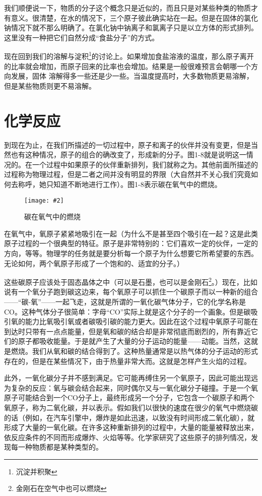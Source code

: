 \documentclass[12pt,oneside]{book}
\newenvironment{fig}[2][1]
{\begin{figure}[H]
\centering
\texttt{[image: \#2]}}
{\end{figure}}
\begin{document}
我们顺便说一下，物质的分子这个概念只是近似的，而且只是对某些种类的物质才有意义。很清楚，在水的情况下，三个原子彼此确实站在一起。但是在固体的氯化钠情况下就不那么明确了。在氯化钠中钠离子和氯离子只是以立方体的形式排列。这里没有一种把它们自然分成“食盐分子”的方式。

现在回到我们的溶解与淀积\footnote{沉淀并积聚}的讨论上。如果增加食盐溶液的温度，那么原子离开的比率就会增加，而原子回来的比率也会增加。结果是一般很难预言会朝哪一个方向发展，固体
溶解得多一些还是少一些。当温度提高时，大多数物质更易溶解， 但是某些物质则更不易溶解。

\section{化学反应}
到现在为止，在我们所描述的一切过程中，原子和离子的伙伴并没有变更，但是当然也有这种情况，原子的组合的确改变了，形成新的分子。图1-8就是说明这一情况的。在一个过程中如果原子的伙伴重新排列，我们就称之为。其他前面所描述的过程称为物理过程，但是二者之间并没有明显的界限（大自然并不关心我们究竟如何去称呼，她只知道不断地进行工作）。图1-8表示碳在氧气中的燃烧。
\begin{fig}{碳在氧气中的燃烧}
\caption{碳在氧气中的燃烧}
\label{fig:碳在氧气中的燃烧}
\end{fig}
在氧气中，氧原子紧紧地吸引在一起（为什么不是甚至四个吸引在一起？这是此类原子过程的一个很典型的特征。原子是非常特别的：它们喜欢一定的伙伴，一定的方向，等等。物理学的任务就是要分析每一个原子为什么想要它所希望要的东西。无论如何，两个氧原子形成了一个饱和的、适宜的分子。）

这些碳原子应该处于固态晶体之中（可以是石墨，也可以是金刚石\footnote{金刚石在空气中也可以燃烧}。）现在，比如说有一个氧分子跑到碳这边来，每个氧原子可以抓住一个碳原子而以一种新的组合——“碳-氧”——一起飞走，这就是所谓的一氧化碳气体分子，它的化学名称是CO。这种气体分子很简单：字母“CO”实际上就是这个分子的一个画象。但是碳吸引氧的能力比氧吸引氧或者碳吸引碳的能力更大。因此在这个过程中氧原子可能在到达时只带有一点点能量，但是氧和碳的结合却是非常彻底而剧烈的，所有靠近它们的原子都吸收能量。于是就产生了大量的分子运动的能量——动能。当然，这就是燃烧。我们从氧和碳的结合得到了。这种热量通常是以热气体的分子运动的形式存在的，但是在某些情况下，由于热量非常大而。这就是怎样产生火焰的过程。

此外，一氧化碳分子并不感到满足。它可能再缚住另一个氧原子，因此可能出现远为复杂的反应：氧与碳会结合起来，同时偶尔又与一氧化碳分子碰撞。于是一个氧原子可能结合到一个CO分子上，最终形成另一个分子，它包含一个碳原子和两个氧原子，称为二氧化碳，并以表示。假如我们以很快的速度在很少的氧气中燃烧碳的话（例如，在汽车引擎中，爆炸是如此迅速，以致没有时间形成二氧化碳），就形成了大量的一氧化碳。在许多这种重新排列的过程中，大量的能量被释放出来，依反应条件的不同而形成爆炸、火焰等等。化学家研究了这些原子的排列情况，发现每一种物质都是某种类型的。
\end{document}
